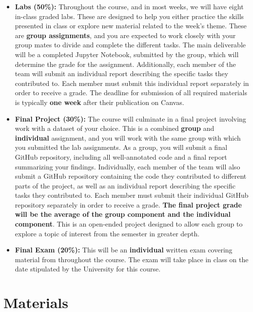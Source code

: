 \documentclass[12pt]{article}
\begin{document}
\begin{itemize}

\item \textbf{Labs (50\%):} Throughout the course, and in most weeks, we will have eight in-class graded labs. These are designed to help you either practice the skills presented in class or explore new material related to the week's theme. These are \textbf{group assignments}, and you are expected to work closely with your group mates to divide and complete the different tasks. The main deliverable will be a completed Jupyter Notebook, submitted by the group, which will determine the grade for the assignment. Additionally, each member of the team will submit an individual report describing the specific tasks they contributed to. Each member must submit this individual report separately in order to receive a grade. The deadline for submission of all required materials is typically \textbf{one week} after their publication on Canvas. 

\item \textbf{Final Project (30\%):} The course will culminate in a final project involving work with a dataset of your choice. This is a combined \textbf{group} and \textbf{individual} assignment, and you will work with the same group with which you submitted the lab assignments. As a group, you will submit a final GitHub repository, including all well-annotated code and a final report summarizing your findings. Individually, each member of the team will also submit a GitHub repository containing the code they contributed to different parts of the project, as well as an individual report describing the specific tasks they contributed to. Each member must submit their individual GitHub repository separately in order to receive a grade. \textbf{The final project grade will be the average of the group component and the individual component}. This is an open-ended project designed to allow each group to explore a topic of interest from the semester in greater depth. 

\item \textbf{Final Exam (20\%):} This will be an \textbf{individual} written exam covering material from throughout the course. The exam will take place in class on the date stipulated by the University for this course.

\end{itemize}

\section*{Materials}
\end{document}
